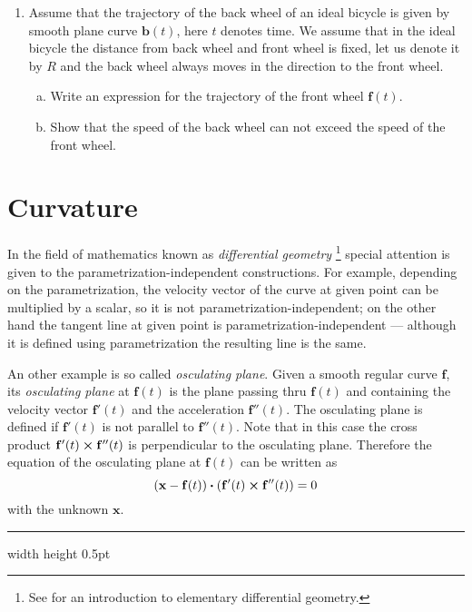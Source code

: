 \begin{enumerate}[\bfseries 1.]
  \item Assume that the trajectory of the back wheel of an ideal bicycle is given by smooth plane curve $\mathbf{b}(t)$, here $t$ denotes time. 
  We assume that in the ideal bicycle the distance from back wheel and front wheel is fixed, let us denote it by $R$ and the back wheel always moves in the direction to the front wheel.
  
  \begin{enumerate}[(a)]
  \item Write an expression for the trajectory of the front wheel $\mathbf{f}(t)$. 
  \item Show that the speed of the back wheel can not exceed the speed of the front wheel.
  \end{enumerate}
\end{enumerate}

\newpage
\section{Curvature}

In the field of mathematics known as \emph{differential
geometry}%
\footnote{See \cite{one} for an introduction to elementary differential geometry.} 
 special attention is given to the parametrization-independent constructions.
For example, depending on the parametrization, the velocity vector of the curve at given point can be multiplied by a scalar, so it is not parametrization-independent;
on the other hand the tangent line at given point is parametrization-independent --- although it is defined using parametrization the resulting line is the same.

An other example is so called \emph{osculating plane}.
Given a smooth regular curve $\mathbf{f}$,
its \emph{osculating plane} at $\mathbf{f}(t)$
is the plane passing thru $\mathbf{f}(t)$ and containing the velocity vector $\mathbf{f}'(t)$ and the acceleration $\mathbf{f}''(t)$.
The osculating plane is defined if $\mathbf{f}'(t)$ is not parallel to $\mathbf{f}''(t)$.
Note that in this case the cross product $\mathbf{f}'(t) \bm{\times} \mathbf{f}''(t)$ is perpendicular to the osculating plane.
Therefore the equation of the osculating plane at $\mathbf{f}(t)$ can be written as
\[(\mathbf{x}-\mathbf{f}(t)) \bm{\cdot} (\mathbf{f}'(t) \bm{\times} \mathbf{f}''(t))=0\]
with the unknown $\mathbf{x}$.

\medskip
\hrule width \textwidth height 0.5pt

